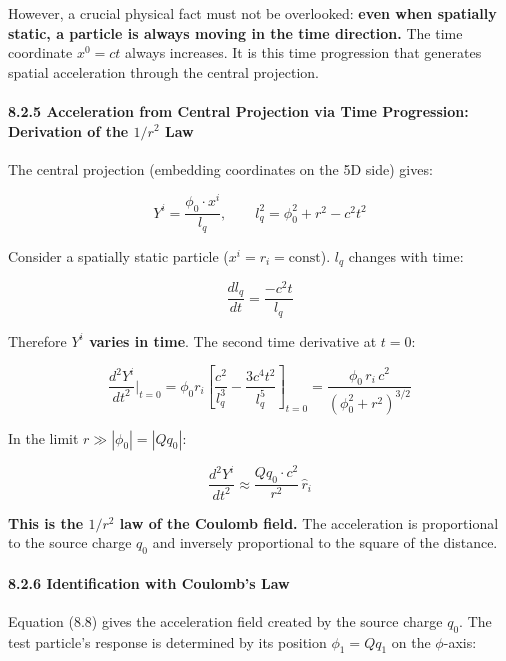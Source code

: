 \documentclass[a4paper,11pt]{article}
\theoremstyle{definition}
\begin{document}
However, a crucial physical fact must not be overlooked: \textbf{even when spatially static, a particle is always moving in the time direction.} The time coordinate \(x^0 = ct\) always increases. It is this time progression that generates spatial acceleration through the central projection.

\paragraph{\texorpdfstring{8.2.5 Acceleration from Central Projection via Time Progression: Derivation of the \(1/r^2\) Law}{8.2.5 Acceleration from Central Projection via Time Progression: Derivation of the 1/r\^{}2 Law}}\label{acceleration-from-central-projection-via-time-progression-derivation-of-the-1r2-law}

The central projection (embedding coordinates on the 5D side) gives:

\[Y^i = \frac{\phi_0 \cdot x^i}{l_q}, \qquad l_q^2 = \phi_0^2 + r^2 - c^2t^2 \tag{8.5}\]

Consider a spatially static particle (\(x^i = r_i = \text{const}\)). \(l_q\) changes with time:

\[\frac{dl_q}{dt} = \frac{-c^2t}{l_q} \tag{8.6}\]

Therefore \textbf{\(Y^i\) varies in time}. The second time derivative at \(t = 0\):

\[\frac{d^2 Y^i}{dt^2}\bigg|_{t=0} = \phi_0 r_i \left[\frac{c^2}{l_q^3} - \frac{3c^4t^2}{l_q^5}\right]_{t=0} = \frac{\phi_0 \, r_i \, c^2}{(\phi_0^2 + r^2)^{3/2}} \tag{8.7}\]

In the limit \(r \gg |\phi_0| = |Qq_0|\):

\[\boxed{\frac{d^2 Y^i}{dt^2} \approx \frac{Qq_0 \cdot c^2}{r^2}\,\hat{r}_i} \tag{8.8}\]

\textbf{This is the \(1/r^2\) law of the Coulomb field.} The acceleration is proportional to the source charge \(q_0\) and inversely proportional to the square of the distance.

\paragraph{8.2.6 Identification with Coulomb's Law}\label{identification-with-coulombs-law}

Equation (8.8) gives the acceleration field created by the source charge \(q_0\). The test particle's response is determined by its position \(\phi_1 = Qq_1\) on the \(\phi\)-axis:
\end{document}
